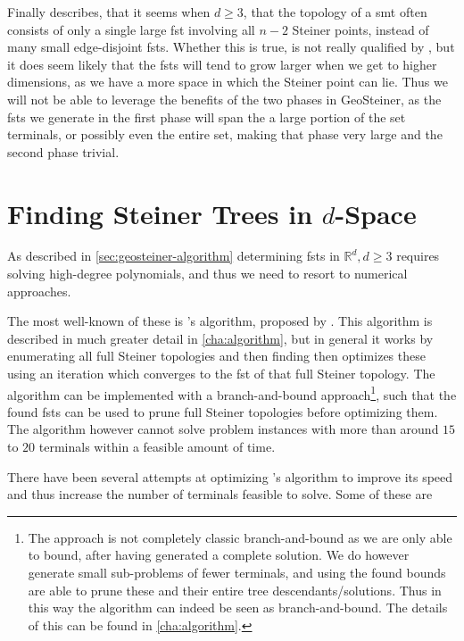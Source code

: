 Finally \textcite[p.~142]{smith1992} describes, that it seems when $d \ge 3$,
that the topology of a \ac{smt} often consists of only a single large \ac{fst}
involving all $n-2$ Steiner points, instead of many small edge-disjoint
\acp{fst}. Whether this is true, is not really qualified by
\textcite{smith1992}, but it does seem likely that the \acp{fst} will tend to
grow larger when we get to higher dimensions, as we have a more space in which
the Steiner point can lie. Thus we will not be able to leverage the benefits of
the two phases in GeoSteiner, as the \acp{fst} we generate in the first phase
will span the a large portion of the set terminals, or possibly even the entire
set, making that phase very large and the second phase trivial.

\section{Finding Steiner Trees in $d$-Space}
\label{sec:find-stein-trees-d}

As described in \cref{sec:geosteiner-algorithm} determining \acp{fst} in
$\mathbb{R}^d, d \ge 3$ requires solving high-degree polynomials, and thus we
need to resort to numerical approaches.

The most well-known of these is \citeauthor{smith1992}'s algorithm, proposed by
\textcite{smith1992}. This algorithm is described in much greater detail in
\cref{cha:algorithm}, but in general it works by enumerating all full Steiner
topologies and then finding then optimizes these using an iteration which
converges to the \ac{fst} of that full Steiner topology. The algorithm can be
implemented with a branch-and-bound approach\footnote{The approach is not
  completely classic branch-and-bound as we are only able to bound, after having
  generated a complete solution. We do however generate small sub-problems of
  fewer terminals, and using the found bounds are able to prune these and their
  entire tree descendants/solutions. Thus in this way the algorithm can indeed
  be seen as branch-and-bound. The details of this can be found in
  \cref{cha:algorithm}.}, such that the found \acp{fst} can be used to prune
full Steiner topologies before optimizing them. The algorithm however cannot
solve problem instances with more than around $15$ to $20$ terminals within a
feasible amount of time.

There have been several attempts at optimizing \citeauthor{smith1992}'s
algorithm to improve its speed and thus increase the number of terminals
feasible to solve. Some of these are

